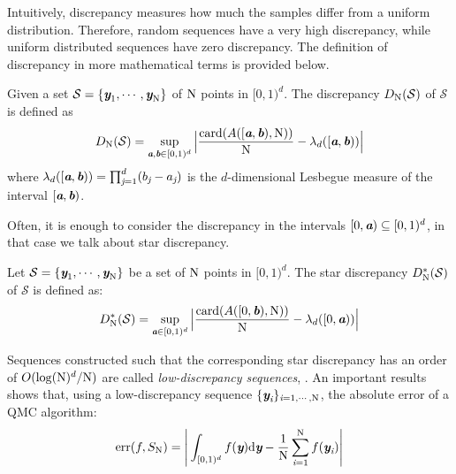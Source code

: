 Intuitively, discrepancy measures how much the samples differ from a uniform distribution.
Therefore, random sequences have a very high discrepancy, while uniform distributed sequences have zero discrepancy.
The definition of discrepancy in more mathematical terms is provided below. 
\begin{definition}
Given a set $\mathcal{S} = \{\textit{\textbf{y}}_1, \cdots, \textit{\textbf{y}}_{\textrm{N}}\}$ of $\textrm{N}$ points in $[0,1)^d$. The discrepancy $D_{\textrm{N}}({\mathcal{S}})$ of $\mathcal{S}$ is defined as
\begin{equation}
D_{\textrm{N}}({\mathcal{S}}) = \sup_{\textit{\textbf{a}}, \textit{\textbf{b}}\in[0,1)^d}\Big|\frac{\textrm{card}(A([\textit{\textbf{a}},\textit{\textbf{b}}), \textrm{N}))}{\textrm{N}}-\lambda_d([\textit{\textbf{a}}, \textit{\textbf{b}}))\Big|
\end{equation}
where $\lambda_d([\textit{\textbf{a}},\textit{\textbf{b}})) = \prod_{\textit{j}=1}^{d}(b_{\textit{j}}-a_{\textit{j}})$ is the $d$-dimensional Lesbegue measure of the interval $[\textit{\textbf{a}},\textit{\textbf{b}})$.
\end{definition}
Often, it is enough to consider the discrepancy in the intervals $[0,\textit{\textbf{a}})\subseteq[0,1)^d$, in that case we talk about star discrepancy.
 \begin{definition}
Let $\mathcal{S} = \{\textit{\textbf{y}}_1, \cdots, \textit{\textbf{y}}_{\textrm{N}}\}$ be a set of $\textrm{N}$ points in $[0,1)^d$. The  star discrepancy $D^*_{\textrm{N}}({\mathcal{S}})$ of $\mathcal{S}$ is defined as:
\begin{equation}
D^*_{\textrm{N}}({\mathcal{S}}) = \sup_{\textit{\textbf{a}}\in[0,1)^d}\Big|\frac{\textrm{card}(A([0,\textit{\textbf{b}}), \textrm{N}))}{\textrm{N}}-\lambda_d([0, \textit{\textbf{a}}))\Big|
\end{equation}
\end{definition}
Sequences constructed such that the corresponding star discrepancy has an order of $O(\log(\textrm{N})^d/\textrm{N})$ are called \textit{low-discrepancy sequences}, \cite{owen2003quasi}.
An important results shows that, using a low-discrepancy sequence $\{\textit{\textbf{y}}_{\textit{i}}\}_{\textit{i}=1, \cdots, \textrm{N}}$, the absolute error of a QMC algorithm:
\begin{equation}
\textrm{err}(f, S_{\textrm{N}}) =\Bigg|\int_{[0,1)^d}f(\textit{\textbf{y}}) \textrm{d}\textit{\textbf{y}}-\frac{1}{\textrm{N}}\sum_{\textit{i}=1}^{\textrm{N}}f(\textit{\textbf{y}}_{\textit{i}})\Bigg|
\end{equation}
